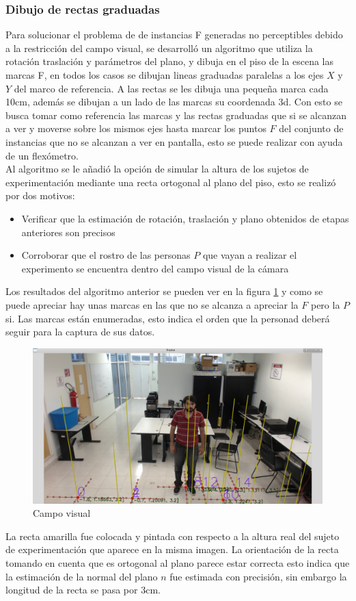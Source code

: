 \subsubsection{Dibujo de rectas graduadas}
Para solucionar el problema de de instancias F generadas no perceptibles debido a la restricción del campo visual, se desarrolló un algoritmo que utiliza la rotación traslación y parámetros del plano, y dibuja en el piso de la escena las marcas F, en todos los casos se dibujan lineas graduadas paralelas a los ejes $X$ y $Y$ del marco de referencia. A las rectas se les dibuja una pequeña marca cada 10cm, además se dibujan a un lado de las marcas su coordenada 3d. Con esto se busca tomar como referencia las marcas y las rectas graduadas que si se alcanzan a ver y moverse sobre los mismos ejes hasta marcar los puntos $F$ del conjunto de instancias que no se alcanzan a ver en pantalla, esto se puede realizar con ayuda de un flexómetro.\\
Al algoritmo se le añadió la opción de simular la altura de los sujetos de experimentación mediante una recta ortogonal al plano del piso, esto se realizó por dos motivos:
\begin{itemize}
	\item Verificar que la estimación de rotación, traslación y plano obtenidos de etapas anteriores son precisos
	\item Corroborar que el rostro de las personas $P$ que vayan a realizar el experimento se encuentra dentro del campo visual de la cámara
\end{itemize}
Los resultados del algoritmo anterior se pueden ver en la figura \ref{fig: figMarcasPiso} y como se puede apreciar hay unas marcas en las que no se alcanza a apreciar la $F$ pero la $P$ si. Las marcas están enumeradas, esto indica el orden que la personad deberá seguir para la captura de sus datos.\\
\begin{figure}[htbp] 
	\centering
	\includegraphics[width=.65\textwidth]{./pictures/marcasPiso}
	\caption{Campo visual}\label{fig: figMarcasPiso}
\end{figure}
La recta amarilla fue colocada y pintada con respecto a la altura real del sujeto de experimentación que aparece en la misma imagen. La orientación de la recta tomando en cuenta que es ortogonal al plano parece estar correcta esto indica que la estimación de la normal del plano $n$ fue estimada con precisión, sin embargo la longitud de la recta se pasa por 3cm.




